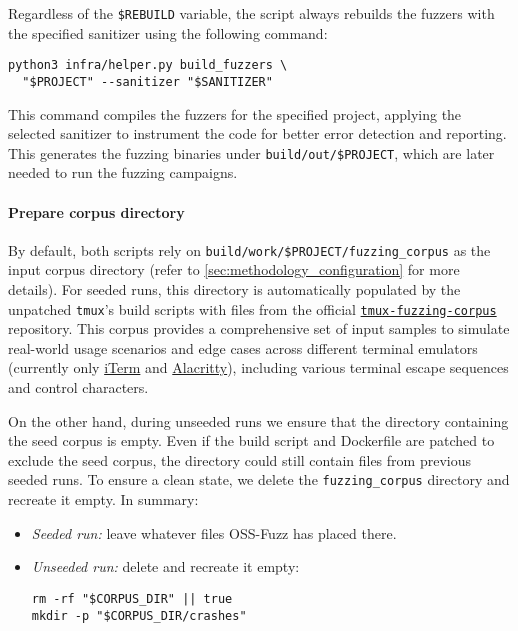 Regardless of the \texttt{\$REBUILD} variable, the script always rebuilds the fuzzers with the specified sanitizer using the following command:

\begin{verbatim}
python3 infra/helper.py build_fuzzers \
  "$PROJECT" --sanitizer "$SANITIZER" 
\end{verbatim}

This command compiles the fuzzers for the specified project, applying the selected sanitizer to instrument the code for better error detection and reporting. This generates the fuzzing binaries under \texttt{build/out/\$PROJECT}, which are later needed to run the fuzzing campaigns.

\noindent \paragraph{Prepare corpus directory}

By default, both scripts rely on \texttt{build/work/\$PROJECT/fuzzing\_corpus} as the input corpus directory (refer to \autoref{sec:methodology_configuration} for more details). For seeded runs, this directory is automatically populated by the unpatched \texttt{tmux}'s build scripts with files from the official \href{https://github.com/tmux/tmux-fuzzing-corpus/}{\texttt{tmux-fuzzing-corpus}} repository. This corpus provides a comprehensive set of input samples to simulate real-world usage scenarios and edge cases across different terminal emulators (currently only \href{https://iterm2.com/}{iTerm} and \href{https://alacritty.org/}{Alacritty}), including various terminal escape sequences and control characters. \cite{tmux:tmux-fuzzing-corpus}

On the other hand, during unseeded runs we ensure that the directory containing the seed corpus is empty. Even if the build script and Dockerfile are patched to exclude the seed corpus, the directory could still contain files from previous seeded runs. To ensure a clean state, we delete the \texttt{fuzzing\_corpus} directory and recreate it empty. In summary:

\begin{itemize}
	\item \emph{Seeded run:} leave whatever files OSS-Fuzz has placed there.
	\item \emph{Unseeded run:} delete and recreate it empty:
	      \begin{verbatim}
rm -rf "$CORPUS_DIR" || true
mkdir -p "$CORPUS_DIR/crashes"
\end{verbatim}
\end{itemize}

